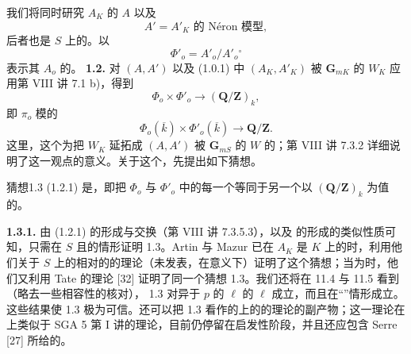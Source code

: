 我们将同时研究 $A_K$ 的  $A$ 以及
\[A'=A'_K\text{ 的 Néron 模型},\tag{1.1.7}\]
后者也是 $S$ 上的。以
\[\Phi'_o=A'_o/A'_o{}^\circ\tag{1.1.8}\]
表示其 $A_o$ 的。
\textbf{1.2.} 对 $(A,A')$ 以及 (1.0.1) 中 $(A_K,A'_K)$ 被 $\mathbf G_{mK}$ 的 $W_K$ 应用第 VIII 讲 7.1 b)，得到
\[\Phi_o\times\Phi'_o\longrightarrow(\mathbf Q/\mathbf Z)_k,\tag{1.2.1}\]
即 $\pi_o$ 模的
\[\Phi_o(\overline k)\times\Phi'_o(\overline k)\longrightarrow\mathbf Q/\mathbf Z.\tag{1.2.2}\]
这里，这个为把 $W_K$ 延拓成 $(A,A')$ 被 $\mathbf G_{mS}$ 的 $W$ 的；第 VIII 讲 7.3.2 详细说明了这一观点的意义。关于这个，先提出如下猜想。
\begin{SGAresult}{猜想}{1.3}
 (1.2.1) 是，即把 $\Phi_o$ 与 $\Phi'_o$ 中的每一个等同于另一个以 $(\mathbf Q/\mathbf Z)_k$ 为值的。
\end{SGAresult}
\textbf{1.3.1.} 由 (1.2.1) 的形成与交换（第 VIII 讲 7.3.5.3），以及 的形成的类似性质可知，只需在 $S$ 且的情形证明 1.3。Artin 与 Mazur 已在 $A_K$ 是 $K$ 上的时，利用他们关于 $S$ 上的相对的的理论（未发表，在意义下）证明了这个猜想；当为时，他们又利用 Tate 的理论 [32] 证明了同一个猜想 1.3。我们还将在 11.4 与 11.5 看到（略去一些相容性的核对），
1.3 对异于 $p$ 的 $\ell$ 的 $\ell$ 成立，而且在“”情形成立。这些结果使 1.3 极为可信。还可以把 1.3 看作的上的的理论的副产物；这一理论在上类似于 SGA 5 第 I 讲的理论，目前仍停留在启发性阶段，并且还应包含 Serre [27] 所给的。

